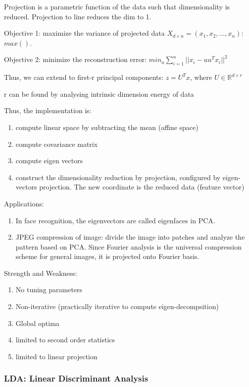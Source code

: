 \documentclass{article}
\begin{document}
Projection is a parametric function of the data such that dimensionality is reduced.
Projection to line reduces the dim to 1.

Objective 1: maximize the variance of projected data $X_{d\times n}=(x_1,x_2,...,x_n)$: $max()$.

Objective 2: minimize the reconstruction error: $min_{u} \sum_{i=1}^n ||x_i-uu^Tx_i||^2$

Thus, we can extend to first-r principal components: $z=U^Tx$, where $U\in \mathbb{R}^{d\times r}$

r can be found by analysing intrinsic dimension energy of data


Thus, the implementation is:

\begin{enumerate}

\item compute linear space by subtracting the mean (affine space)
\item compute covariance matrix
\item compute eigen vectors
\item construct the dimensionality reduction by projection, configured by eigen-vectors projection. The new coordinate is the reduced data (feature vector)
\end{enumerate}

Applications:
\begin{enumerate}
\item In face recognition, the eigenvectors are called eigenfaces in PCA.
\item JPEG compression of image: divide the image into patches and analyze the pattern based on PCA. Since Fourier analysis is the universal compression scheme for general images, it is projected onto Fourier basis.
\end{enumerate}

Strength and Weakness:
\begin{enumerate}
\item No tuning parameters
\item Non-iterative (practically iterative to compute eigen-decompsition)
\item Global optima 
\item limited to second order statistics
\item limited to linear projection
\end{enumerate}

\subsubsection{LDA: Linear Discriminant Analysis}
\end{document}
